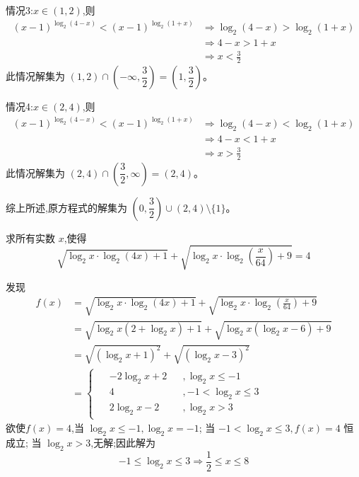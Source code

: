 \begin{questions}
\begin{solution}
        情况3:$x \in (1, 2)$,则
        \begin{align*}
        (x-1)^{\log_2 (4-x)} < (x-1)^{\log_2 (1+x)} & \Rightarrow \log_2 (4-x) > \log_2 (1+x) \\
        & \Rightarrow 4-x > 1+x \\
        & \Rightarrow x < \frac{3}{2}
        \end{align*}
        此情况解集为 $(1, 2) \cap \left(-\infty, \dfrac{3}{2}\right) = \left(1, \dfrac{3}{2}\right)$。

        情况4:$x \in (2, 4)$,则
        \begin{align*}
        (x-1)^{\log_2 (4-x)} < (x-1)^{\log_2 (1+x)} & \Rightarrow \log_2 (4-x) < \log_2 (1+x) \\
        & \Rightarrow 4-x < 1+x \\
        & \Rightarrow x > \frac{3}{2}
        \end{align*}
        此情况解集为 $(2, 4) \cap \left(\dfrac{3}{2},\infty \right) = (2, 4)$。

        综上所述,原方程式的解集为 $\left(0, \dfrac{3}{2}\right) \cup (2, 4) \setminus \{1\}$。
    \end{solution}

    \question 求所有实数 $x$,使得
    \[
    \sqrt{\log_2 x \cdot \log_2 (4x) + 1} + \sqrt{\log_2 x \cdot \log_2 \left(\frac{x}{64}\right) + 9} = 4
    \]
    \begin{solution}
        发现
        \begin{align*}
        f(x) 
        &= \sqrt{\log_2 x \cdot \log_2(4x) + 1} + \sqrt{\log_2 x \cdot \log_2\left(\frac{x}{64}\right) + 9} \\
        &= \sqrt{\log_2 x (2 + \log_2 x) + 1} + \sqrt{\log_2 x (\log_2 x - 6) + 9} \\
        &= \sqrt{(\log_2 x + 1)^2} + \sqrt{(\log_2 x - 3)^2} \\
        &= 
        \begin{cases}
        \begin{aligned}
        &-2\log_2 x+ 2&&, \log_2 x \le -1 \\[1mm]
        &4&&, -1 < \log_2 x \le 3 \\[1mm]
        &2\log_2 x- 2&&, \log_2 x > 3
        \end{aligned}
        \end{cases}
        \end{align*}
        欲使$f(x)=4$,当 $\log_2 x \le -1,\log_2x = -1$;
        当 $-1 < \log_2x \le 3,f(x) = 4$ 恒成立;
        当 $\log_2x > 3$,无解;因此解为
        \[
        -1 \le \log_2x \le 3 \Rightarrow \frac{1}{2} \le x \le 8
        \]
    \end{solution}


\end{questions}
